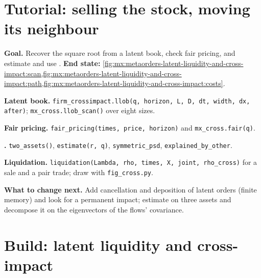\section{Tutorial: selling the stock, moving its neighbour}\label{tut:mx:metaorders-latent-liquidity-and-cross-impact:tut}

\begin{tutorial}
\textbf{Goal.} Recover the square root from a latent book, check fair pricing, and estimate and use .
\textbf{End state:} \cref{fig:mx:metaorders-latent-liquidity-and-cross-impact:scan,fig:mx:metaorders-latent-liquidity-and-cross-impact:path,fig:mx:metaorders-latent-liquidity-and-cross-impact:costs}.
\begin{tutsteps}
\item \textbf{Latent book.} \texttt{firm\_crossimpact.llob(q, horizon, L, D, dt, width, dx, after)}; \texttt{mx\_cross.llob\_scan()} over eight sizes.
\item \textbf{Fair pricing.} \texttt{fair\_pricing(times, price, horizon)} and \texttt{mx\_cross.fair(q)}.
\item \textbf{.} \texttt{two\_assets()}, \texttt{estimate(r, q)}, \texttt{symmetric\_psd}, \texttt{explained\_by\_other}.
\item \textbf{Liquidation.} \texttt{liquidation(Lambda, rho, times, X, joint, rho\_cross)} for a sale and a pair trade; draw with \texttt{fig\_cross.py}.
\end{tutsteps}
\textbf{What to change next.} Add cancellation and deposition of latent orders (finite memory) and look for a permanent impact; estimate  on
three assets and decompose it on the eigenvectors of the flows' covariance.
\end{tutorial}

\section{Build: latent liquidity and cross-impact}\label{bld:mx:metaorders-latent-liquidity-and-cross-impact:crossimpact}

